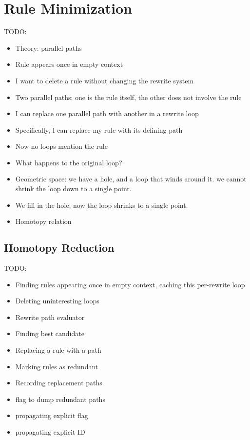 \documentclass[../generics]{subfiles}
\begin{document}
\chapter[]{Rule Minimization}\label{rqm minimization}

\ifWIP
TODO:
\begin{itemize}
\item Theory: parallel paths
\item Rule appears once in empty context
\item I want to delete a rule without changing the rewrite system
\item Two parallel paths; one is the rule itself, the other does not involve the rule
\item I can replace one parallel path with another in a rewrite loop
\item Specifically, I can replace my rule with its defining path
\item Now no loops mention the rule
\item What happens to the original loop?
\item Geometric space: we have a hole, and a loop that winds around it. we cannot shrink the loop down to a single point.
\item We fill in the hole, now the loop shrinks to a single point.
\item Homotopy relation
\end{itemize}
\fi

\section[]{Homotopy Reduction}\label{homotopy reduction}


\ifWIP
TODO:
\begin{itemize}
\item Finding rules appearing once in empty context, caching this per-rewrite loop
\item Deleting uninteresting loops
\item Rewrite path evaluator
\item Finding best candidate
\item Replacing a rule with a path
\item Marking rules as redundant
\item Recording replacement paths
\item flag to dump redundant paths
\item propagating explicit flag
\item propagating explicit ID
\end{itemize}
\fi
\end{document}
